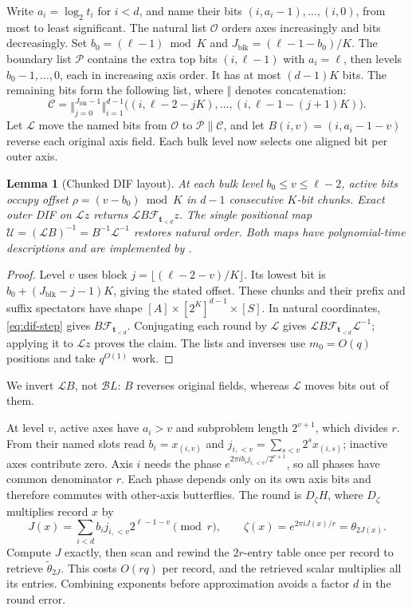 \documentclass[11pt]{article}
\newtheorem{lemma}[theorem]{Lemma}
\theoremstyle{definition}
\renewcommand{\label}[1]{}%
\newcommand{\cF}{\mathcal{F}}
\begin{document}
Write $a_i=\log_2t_i$ for $i<d$, and name their bits
$(i,a_i-1),\ldots,(i,0)$, from most to least significant.
The natural list $\mathcal O$ orders axes increasingly and bits decreasingly.
Set $b_0=(\ell-1)\bmod K$ and $J_{\mathrm{blk}}=(\ell-1-b_0)/K$.
The boundary list $\mathcal P$ contains the extra top bits $(i,\ell-1)$ with $a_i=\ell$,
then levels $b_0-1,\ldots,0$, each in increasing axis order.
It has at most $(d-1)K$ bits.
The remaining bits form the following list, where $\Vert$ denotes concatenation:
\[
 \mathcal C=\mathop{\Vert}_{j=0}^{J_{\mathrm{blk}}-1}
             \mathop{\Vert}_{i=1}^{d-1}
 \bigl((i,\ell-2-jK),\ldots,(i,\ell-1-(j+1)K)\bigr).
\]
Let $\mathcal L$ move the named bits from $\mathcal O$ to
$\mathcal P\mathbin{\|}\mathcal C$, and let
$B(i,v)=(i,a_i-1-v)$ reverse each original axis field.
Each bulk level now selects one aligned bit per outer axis.

\begin{lemma}[Chunked DIF layout]\label{lem:dif-layout}
At each bulk level $b_0\le v\le\ell-2$, active bits occupy offset
$\rho=(v-b_0)\bmod K$ in $d-1$ consecutive $K$-bit chunks.
Exact outer DIF on $\mathcal Lz$ returns $\mathcal LB\cF_{\mathbf t_{<d}}z$.
The single positional map $\mathcal U=(\mathcal LB)^{-1}=B^{-1}\mathcal L^{-1}$
restores natural order. Both maps have polynomial-time descriptions and
are implemented by .
\end{lemma}
\begin{proof}
Level $v$ uses block $j=\lfloor(\ell-2-v)/K\rfloor$.
Its lowest bit is $b_0+(J_{\mathrm{blk}}-j-1)K$, giving the stated offset.
These chunks and their prefix and suffix spectators have shape
$[A]\times[2^K]^{d-1}\times[S]$.
In natural coordinates, \eqref{eq:dif-step} gives $B\cF_{\mathbf t_{<d}}$.
Conjugating each round by $\mathcal L$ gives
$\mathcal LB\cF_{\mathbf t_{<d}}\mathcal L^{-1}$;
applying it to $\mathcal Lz$ proves the claim.
The lists and inverses use $m_0=O(q)$ positions and take $q^{O(1)}$ work.
\end{proof}

We invert $\mathcal LB$, not $\mathcal BL$: $B$ reverses original fields,
whereas $\mathcal L$ moves bits out of them.

At level $v$, active axes have $a_i>v$ and subproblem length $2^{v+1}$, which divides $r$.
From their named slots read $b_i=x_{(i,v)}$ and
$j_{i,<v}=\sum_{s<v}2^sx_{(i,s)}$; inactive axes contribute zero.
Axis $i$ needs the phase $e^{2\pi i b_i j_{i,<v}/2^{v+1}}$, so all phases have common denominator $r$.
Each phase depends only on its own axis bits and therefore commutes with other-axis butterflies.
The round is $D_\zeta H$, where $D_\zeta$ multiplies record $x$ by
\[
 J(x)=\sum_{i<d}b_i j_{i,<v}2^{\ell-1-v}\pmod r,\qquad
 \zeta(x)=e^{2\pi iJ(x)/r}=\theta_{2J(x)}.
\]
Compute $J$ exactly, then scan and rewind the $2r$-entry table once per record to retrieve $\tilde\theta_{2J}$.
This costs $O(rq)$ per record, and the retrieved scalar multiplies all its entries.
Combining exponents before approximation avoids a factor $d$ in the round error.
\end{document}
